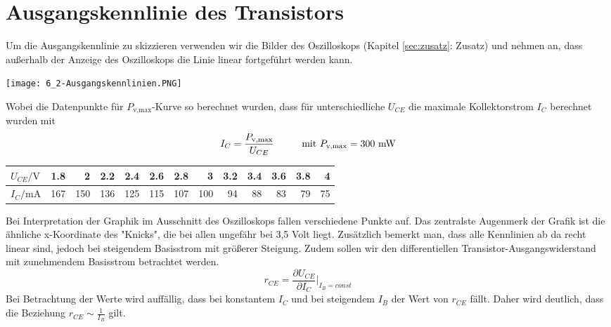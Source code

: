 

\section{Ausgangskennlinie des Transistors}
Um die Ausgangskennlinie zu skizzieren verwenden wir die Bilder des Oszilloskops (Kapitel \ref{sec:zusatz}: Zusatz) und nehmen an, dass außerhalb der Anzeige des Oszilloskops die Linie linear fortgeführt werden kann. 
\begin{center}
    \texttt{[image: 6\_2-Ausgangskennlinien.PNG]}
\end{center}
Wobei die Datenpunkte für $P_{\text{v,max}}$-Kurve so berechnet wurden, dass für unterschiedliche $U_{CE}$ die maximale Kollektorstrom $I_C$ berechnet wurden mit
\begin{align}
    I_C=\frac{P_{\text{v,max}}}{U_{CE}} \hspace*{1cm}\text{mit}~P_{\text{v,max}}=300~\text{mW}
\end{align}
\begin{center}
    \begin{tabular}{l|rrrrrrrrrrrr}
        $U_{CE}/\text{V}$ & 1.8   & 2     & 2.2   & 2.4   & 2.6   & 2.8   & 3     & 3.2   & 3.4   & 3.6   & 3.8   & 4 \\
        \hline
        $I_C/\text{mA}$  & 167 & 150 & 136 & 125 & 115 & 107 & 100 & 94 & 88 & 83 & 79 & 75 \\
    \end{tabular}
\end{center}
Bei Interpretation der Graphik im Ausschnitt des Oszilloskops fallen verschiedene Punkte auf. Das zentralste Augenmerk der Grafik ist die \"ahnliche x-Koordinate des "Knicks", die bei allen ungef\"ahr bei 3,5 Volt liegt. Zus\"atzlich bemerkt man, dass alle Kennlinien ab da recht linear sind, jedoch bei steigendem Basisstrom mit gr\"o\ss{}erer Steigung.
Zudem sollen wir den differentiellen Transistor-Ausgangswiderstand mit zunehmendem Basisstrom betrachtet werden.
\begin{equation}
r_{CE}=\frac{\partial{U_{CE}}}{\partial{I_C}}\Bigg|_{I_B=const}
\end{equation}
Bei Betrachtung der Werte wird auff\"allig, dass bei konstantem $I_C$ und bei steigendem $I_B$ der Wert von $r_{CE}$ f\"allt. Daher wird deutlich, dass die Beziehung $r_{CE}\sim \frac{1}{I_B}$ gilt.\\\\
